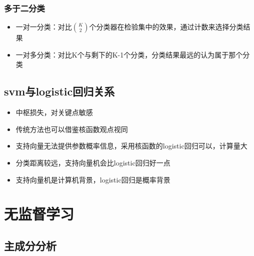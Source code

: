 \documentclass[
]{book}
\providecommand{\tightlist}{%
  \setlength{\itemsep}{0pt}\setlength{\parskip}{0pt}}
\begin{document}
\hypertarget{ux591aux4e8eux4e8cux5206ux7c7b}{%
\subsubsection{多于二分类}\label{ux591aux4e8eux4e8cux5206ux7c7b}}

\begin{itemize}
\tightlist
\item
  一对一分类：对比\(K \choose 2\)个分类器在检验集中的效果，通过计数来选择分类结果
\item
  一对多分类：对比K个与剩下的K-1个分类，分类结果最远的认为属于那个分类
\end{itemize}

\hypertarget{svmux4e0elogisticux56deux5f52ux5173ux7cfb}{%
\subsection{svm与logistic回归关系}\label{svmux4e0elogisticux56deux5f52ux5173ux7cfb}}

\begin{itemize}
\tightlist
\item
  中枢损失，对关键点敏感
\item
  传统方法也可以借鉴核函数观点视同
\item
  支持向量无法提供参数概率信息，采用核函数的logistic回归可以，计算量大
\item
  分类距离较远，支持向量机会比logistic回归好一点
\item
  支持向量机是计算机背景，logistic回归是概率背景
\end{itemize}

\hypertarget{ux65e0ux76d1ux7763ux5b66ux4e60}{%
\section{无监督学习}\label{ux65e0ux76d1ux7763ux5b66ux4e60}}

\hypertarget{ux4e3bux6210ux5206ux5206ux6790}{%
\subsection{主成分分析}\label{ux4e3bux6210ux5206ux5206ux6790}}
\end{document}
